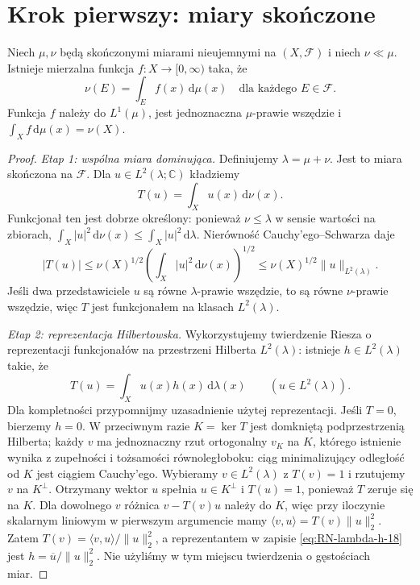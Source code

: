 \section{Krok pierwszy: miary skończone}
\begin{twierdzenie}
\label{thm:RN-finite-18}
Niech $\mu,\nu$ będą skończonymi miarami nieujemnymi
na $(X,\mathcal F)$ i niech $\nu\ll\mu$.
Istnieje mierzalna funkcja $f:X\to[0,\infty)$ taka, że
\begin{equation}\label{eq:RN-finite-18}
\nu(E)=\int_E f(x)\,\mathrm d\mu(x)
\quad\text{dla każdego }E\in\mathcal F.
\end{equation}
Funkcja $f$ należy do $L^1(\mu)$, jest jednoznaczna
$\mu$-prawie wszędzie i
$\int_Xf\,\mathrm d\mu(x)=\nu(X)$.
\end{twierdzenie}
\begin{proof}
\emph{Etap 1: wspólna miara dominująca.}
Definiujemy $\lambda=\mu+\nu$. Jest to miara skończona
na $\mathcal F$. Dla $u\in L^2(\lambda;\mathbb C)$
kładziemy
\[
T(u)=\int_X u(x)\,\mathrm d\nu(x).
\]
Funkcjonał ten jest dobrze określony: ponieważ
$\nu\le\lambda$ w sensie wartości na zbiorach,
$\int_X|u|^2\,\mathrm d\nu(x)\le
\int_X|u|^2\,\mathrm d\lambda$.
Nierówność Cauchy'ego--Schwarza daje
\[
|T(u)|\le\nu(X)^{1/2}
\left(\int_X|u|^2\,\mathrm d\nu(x)\right)^{1/2}
\le\nu(X)^{1/2}\|u\|_{L^2(\lambda)}.
\]
Jeśli dwa przedstawiciele $u$ są równe $\lambda$-prawie
wszędzie, to są równe $\nu$-prawie wszędzie, więc
$T$ jest funkcjonałem na klasach $L^2(\lambda)$.

\emph{Etap 2: reprezentacja Hilbertowska.}
Wykorzystujemy twierdzenie Riesza o reprezentacji
funkcjonałów na przestrzeni Hilberta $L^2(\lambda)$:
istnieje $h\in L^2(\lambda)$ takie, że
\begin{equation}\label{eq:RN-lambda-h-18}
T(u)=\int_Xu(x)h(x)\,\mathrm d\lambda(x)
\qquad(u\in L^2(\lambda)).
\end{equation}
Dla kompletności przypomnijmy uzasadnienie użytej
reprezentacji. Jeśli $T=0$, bierzemy $h=0$.
W przeciwnym razie $K=\ker T$ jest domkniętą
podprzestrzenią Hilberta; każdy $v$ ma jednoznaczny
rzut ortogonalny $v_K$ na $K$, którego istnienie wynika
z zupełności i tożsamości równoległoboku: ciąg
minimalizujący odległość od $K$ jest ciągiem Cauchy'ego.
Wybieramy $v\in L^2(\lambda)$ z $T(v)=1$ i rzutujemy
$v$ na $K^\perp$. Otrzymany wektor $u$ spełnia
$u\in K^\perp$ i $T(u)=1$, ponieważ $T$ zeruje się na $K$.
Dla dowolnego $v$ różnica $v-T(v)u$ należy do $K$,
więc przy iloczynie skalarnym liniowym w pierwszym
argumencie mamy
$\langle v,u\rangle=T(v)\|u\|_2^2$.
Zatem $T(v)=\langle v,u\rangle/\|u\|_2^2$,
a reprezentantem w zapisie \eqref{eq:RN-lambda-h-18}
jest $h=\overline u/\|u\|_2^2$.
Nie użyliśmy w tym miejscu twierdzenia o gęstościach miar.


\end{proof}
